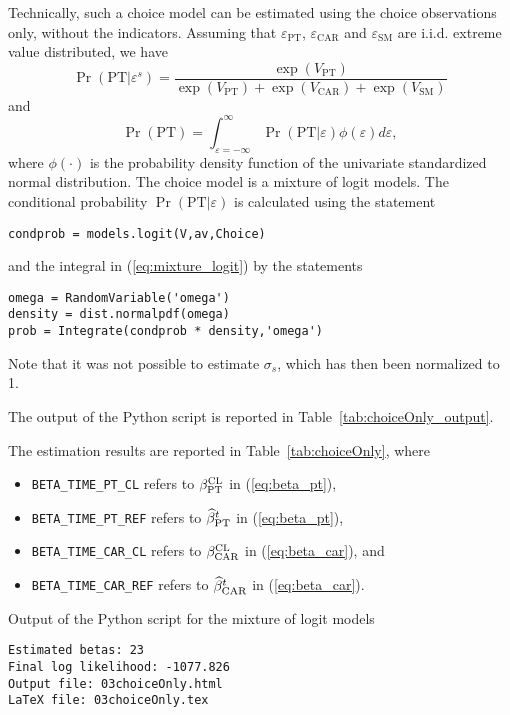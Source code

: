 \documentclass[12pt,a4paper]{article}
\newcommand{\req}[1]{(\ref{#1})}
\newcommand{\prob}{\operatorname{Pr}}
\begin{document}
Technically, such a choice model can be estimated using the choice observations
only, without the indicators. Assuming that $\varepsilon_{\text{PT}}$,
$\varepsilon_{\text{CAR}}$ and $\varepsilon_{\text{SM}}$ are
i.i.d. extreme value distributed, we have
\begin{equation}
\prob(\text{PT}|\varepsilon^s) = \frac{\exp(V_\text{PT})}{\exp(V_\text{PT})+\exp(V_\text{CAR})+\exp(V_\text{SM})} 
\end{equation}
and
\begin{equation}
  \label{eq:mixture_logit}
\prob(\text{PT}) =
\int_{\varepsilon=-\infty}^{\infty}\prob(\text{PT}|\varepsilon)\phi(\varepsilon) d\varepsilon,
\end{equation}
where $\phi(\cdot)$ is the probability density function of
the univariate standardized normal
distribution.
The choice model is a mixture of logit models.
The conditional probability $\prob(\text{PT}|\varepsilon)$ is
calculated using the statement
\begin{lstlisting}
condprob = models.logit(V,av,Choice)
\end{lstlisting}
and the integral in \req{eq:mixture_logit} by the statements
\begin{lstlisting}
omega = RandomVariable('omega')
density = dist.normalpdf(omega) 
prob = Integrate(condprob * density,'omega')
\end{lstlisting}

Note that it was not possible to estimate $\sigma_s$, which has then been
normalized to 1.

The output of the Python script is reported in
Table~\ref{tab:choiceOnly_output}.

The estimation results
are reported in Table~\ref{tab:choiceOnly}, where 
\begin{itemize}
\item \lstinline$BETA_TIME_PT_CL$ refers to $\beta^\protect\text{CL}_\protect\text{PT}$ in \req{eq:beta_pt},
\item \lstinline$BETA_TIME_PT_REF$ refers to $\widehat{\beta}^t_\protect\text{PT}$ in \req{eq:beta_pt},
\item \lstinline$BETA_TIME_CAR_CL$ refers to
  $\beta^\protect\text{CL}_\protect\text{CAR}$ in \req{eq:beta_car}, and
\item \lstinline$BETA_TIME_CAR_REF$ refers to $\widehat{\beta}^t_\protect\text{CAR}$ in \req{eq:beta_car}.
\end{itemize}

\begin{table}[htb]
\caption{\label{tab:choiceOnly_output}Output of the Python script for
  the mixture of logit models}
  \begin{lstlisting}
Estimated betas: 23
Final log likelihood: -1077.826
Output file: 03choiceOnly.html
LaTeX file: 03choiceOnly.tex
  \end{lstlisting}
\end{table}
\end{document}
